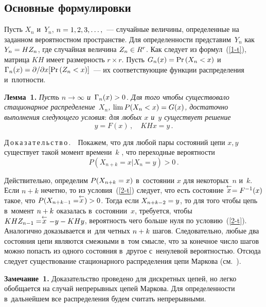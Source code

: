 \begin{multicols}{2}
\section{Основные формулировки}

Пусть $X_n$ и~$Y_n$, $n\hm=1, 2, 3, \ldots,$~--- случайные величины,
определенные на заданном вероятностном пространстве. Для определенности
представим~$Y_n$ как $Y_n\hm=HZ_n$, где случайная величина $Z_n \hm\in R^r$.
Как следует из формул~(\ref{1-t}), матрица $KH$ имеет размерность
$r \times r$. Пусть $G_n(x)\hm=\mathrm{Pr}\,(X_n\hm<x)$
и~$\Gamma_n(x)\hm=\partial/\partial x [\mathrm{Pr}\,(Z_n\hm<x)]$~---
их соответствующие функции распределения и~плотности.

\smallskip

\noindent
\textbf{Лемма~1.} \textit{Пусть $n \rightarrow \infty$ и~$\Gamma_n(x)\hm>0 $.
Для того чтобы существовало стационарное распределение~$X_n$,
$\lim P(X_n < x)\hm=G(x)$, достаточно выполнения следующего условия}:
\textit{для любых $x$ и~$y$ существует решение}
\begin{equation}
y=F(x)\,, \quad KHx=y\,.
\label{2-t}
\end{equation}

\noindent
 Д\,о\,к\,а\,з\,а\,т\,е\,л\,ь\,с\,т\,в\,о\,.\ \ Покажем, что для любой
 пары состояний цепи $x, y$  существует такой момент времени~$k$ ,
 что переходные вероятности
\begin{equation}
P(X_{n+k}=x|X_n=y)>0\,.
\label{3-t}
\end{equation}

Действительно, определим $P(X_{n+k}\hm=x)$ в~состоянии $x$ для некоторых~$n$ и~$k$.
Если $n+k$ нечетно, то из условия~(\ref{2-t}) следует, что есть состояние
$\stackrel{\leftarrow}{x}\hm=F^{-1}(x)$ такое, что
$P(X_{n+k-1}\hm=\stackrel{\leftarrow}{x})\hm>0$. Тогда если
$X_{n+k-2}\hm=y$, то для того чтобы цепь в~момент $n\hm+k$ оказалась
в~состоянии~$x$, требуется, чтобы  $KHZ_{n-1}\hm=\stackrel{\leftarrow}{x}-y-KHy$,
вероятность чего больше нуля по условию~(\ref{2-t}).
Аналогично доказывается и~для четных $n\hm+k$ шагов. Следовательно, любые
два состояния цепи являются смежными в~том смысле, что за конечное число
шагов можно попасть из одного состояния в~другое с~ненулевой вероятностью.
Отсюда следует существование стационарного распределения цепи Маркова
 (см.~\cite{Gikhman}).

\smallskip

\noindent
\textbf{Замечание~1.} Доказательство проведено для дискретных цепей, но
легко обобщается на случай непрерывных цепей Маркова. Для опре\-де\-лен\-ности
в~дальнейшем все распределения будем считать непрерывными.


\end{multicols}
